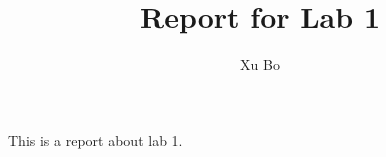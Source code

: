 \documentclass{article}
\title{Report for Lab 1}
\author{Xu Bo}
\date{}
\begin{document}
	\maketitle

	This is a report about lab 1.
\end{document}
